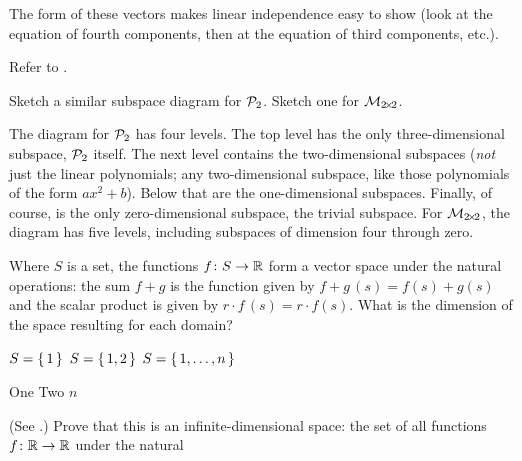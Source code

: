 \begin{exercises}
\begin{answer}
       The form of these vectors makes linear independence easy to show
       (look at the equation of fourth components, then at the equation of 
       third components, etc.).  
    \end{answer}
  \item 
     Refer to .
     \begin{exparts}
       \partsitem Sketch a similar subspace diagram for $\mathcal{P}_2$.
       \partsitem Sketch one for $\mathcal{M}_{2 \! \times \! 2}$.
     \end{exparts}
     \begin{answer}
      \begin{exparts}
       \partsitem The diagram for $\mathcal{P}_2$ has four levels.
          The top level has the only three-dimensional subspace, 
          $\mathcal{P}_2$ itself.
          The next level contains the two-dimensional subspaces
          (\emph{not} just the linear polynomials; any two-dimensional
          subspace, like those polynomials of the form $ax^2+b$).
          Below that are the one-dimensional subspaces.
          Finally, of course, is the only zero-dimensional subspace,
          the trivial subspace.
        \partsitem For $\mathcal{M}_{2 \! \times \! 2}$, the diagram has five levels,
          including subspaces of dimension four through zero.
     \end{exparts}
    \end{answer}
  \recommended \item \label{exer:DimDomToR}
    Where \( S \) is a set, the functions
    \( \mbox{$f\colon S\to \mathbb{R}$} \) form a vector space under the natural operations:
    the sum $f+g$ is the function given by 
    \( f+g\,(s)=f(s)+g(s) \) and the scalar product is given by
    \( r\cdot f \, (s)=r\cdot f(s) \).
    What is the dimension of the space resulting for each domain?
    \begin{exparts*}
      \partsitem \( S=\mbox{$\{\,1\,\}$} \)
      \partsitem \( S=\mbox{$\{\,1,2\,\}$} \)
      \partsitem \( S=\mbox{$\{\,1,\ldots,n\,\}$} \)
    \end{exparts*}
    \begin{answer}
      \begin{exparts*}
        \partsitem One
        \partsitem Two
        \partsitem \( n \)
      \end{exparts*}  
    \end{answer}
  \item  
    (See .)
    Prove that this is an infinite-dimensional space:
    the set of all functions \( \mbox{$f\colon \mathbb{R}\to \mathbb{R}$} \) under the natural

\end{exercises}
